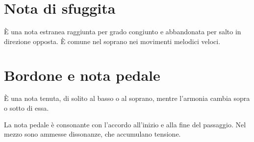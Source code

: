 \section{Nota di sfuggita}
\label{sec:sfuggita}

\begin{definizione}
    È una nota estranea raggiunta per grado congiunto e abbandonata per salto in direzione opposta. È comune nel soprano nei movimenti melodici veloci.
\end{definizione}

\section{Bordone e nota pedale}
\label{sec:pedale}

\begin{definizione}
    È una nota tenuta, di solito al basso o al soprano, mentre l'armonia cambia sopra o sotto di essa.
\end{definizione}

\begin{regola}
    La nota pedale è consonante con l'accordo all'inizio e alla fine del passaggio. Nel mezzo sono ammesse dissonanze, che accumulano tensione.
\end{regola}
